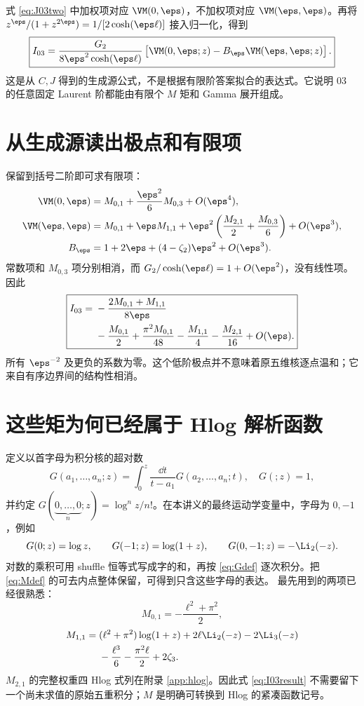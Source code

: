 式 \eqref{eq:J03two} 中加权项对应 $\VM(0,\eps)$，不加权项对应 $\VM(\eps,\eps)$。再将 $z^\eps/(1+z^{2\eps})=1/[2\cosh(\eps\ell)]$ 接入归一化，得到
\begin{equation}
\boxed{I_{03}=
\frac{G_2}{8\eps^2\cosh(\eps\ell)}
\left[\VM(0,\eps;z)-B_\eps\VM(\eps,\eps;z)\right].}
\label{eq:I03all}
\end{equation}
这是从 $C,J$ 得到的生成源公式，不是根据有限阶答案拟合的表达式。它说明 03 的任意固定 Laurent 阶都能由有限个 $M$ 矩和 Gamma 展开组成。

\section{从生成源读出极点和有限项}
保留到括号二阶即可求有限项：
\begin{align}
\VM(0,\eps)&=M_{0,1}+\frac{\eps^2}{6}M_{0,3}+O(\eps^4),\\
\VM(\eps,\eps)&=M_{0,1}+\eps M_{1,1}
+\eps^2\left(\frac{M_{2,1}}2+\frac{M_{0,3}}6\right)+O(\eps^3),\\
B_\eps&=1+2\eps+(4-\zeta_2)\eps^2+O(\eps^3).
\end{align}
常数项和 $M_{0,3}$ 项分别相消，而 $G_2/\cosh(\eps\ell)=1+O(\eps^2)$，没有线性项。因此
\begin{equation}
\boxed{\begin{aligned}
I_{03}={}&-\frac{2M_{0,1}+M_{1,1}}{8\eps}\\
&-\frac{M_{0,1}}2+\frac{\pi^2M_{0,1}}{48}
-\frac{M_{1,1}}4-\frac{M_{2,1}}{16}+O(\eps).
\end{aligned}}
\label{eq:I03result}
\end{equation}
所有 $\eps^{-2}$ 及更负的系数为零。这个低阶极点并不意味着原五维核逐点温和；它来自有序边界间的结构性相消。

\section{这些矩为何已经属于 Hlog 解析函数}
定义以首字母为积分核的超对数
\begin{equation}
G(a_1,\ldots,a_n;z)=\int_0^z\frac{\dd t}{t-a_1}G(a_2,\ldots,a_n;t),
\quad G(;z)=1,
\label{eq:Gdef}
\end{equation}
并约定 $G(\underbrace{0,\ldots,0}_{n};z)=\log^n z/n!$。在本讲义的最终运动学变量中，字母为 $0,-1$，例如
\[
G(0;z)=\log z,\qquad G(-1;z)=\log(1+z),\qquad
G(0,-1;z)=-\Li_2(-z).
\]
对数的乘积可用 shuffle 恒等式写成字的和，再按 \eqref{eq:Gdef} 逐次积分。把 \eqref{eq:Mdef} 的可去内点整体保留，可得到只含这些字母的表达。
最先用到的两项已经很熟悉：
\begin{equation}
M_{0,1}=-\frac{\ell^2+\pi^2}{2},
\end{equation}
\begin{equation}
\begin{aligned}
M_{1,1}={}&(\ell^2+\pi^2)\log(1+z)+2\ell\Li_2(-z)-2\Li_3(-z)\\
&-\frac{\ell^3}{6}-\frac{\pi^2\ell}{2}+2\zeta_3.
\end{aligned}
\end{equation}
$M_{2,1}$ 的完整权重四 Hlog 式列在附录 \ref{app:hlog}。因此式 \eqref{eq:I03result} 不需要留下一个尚未求值的原始五重积分；$M$ 是明确可转换到 Hlog 的紧凑函数记号。

